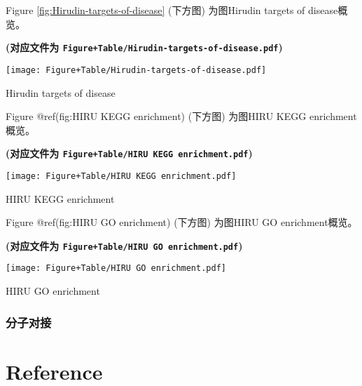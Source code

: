 \documentclass[
]{article}
\begin{document}
Figure \ref{fig:Hirudin-targets-of-disease} (下方图) 为图Hirudin targets of disease概览。

\textbf{(对应文件为 \texttt{Figure+Table/Hirudin-targets-of-disease.pdf})}

\def\@captype{figure}
\begin{center}
\texttt{[image: Figure+Table/Hirudin-targets-of-disease.pdf]}
\caption{Hirudin targets of disease}\label{fig:Hirudin-targets-of-disease}
\end{center}

Figure @ref(fig:HIRU KEGG enrichment) (下方图) 为图HIRU KEGG enrichment概览。

\textbf{(对应文件为 \texttt{Figure+Table/HIRU\ KEGG\ enrichment.pdf})}

\def\@captype{figure}
\begin{center}
\texttt{[image: Figure+Table/HIRU KEGG enrichment.pdf]}
\caption{HIRU KEGG enrichment}\label{fig:HIRU KEGG enrichment}
\end{center}

Figure @ref(fig:HIRU GO enrichment) (下方图) 为图HIRU GO enrichment概览。

\textbf{(对应文件为 \texttt{Figure+Table/HIRU\ GO\ enrichment.pdf})}

\def\@captype{figure}
\begin{center}
\texttt{[image: Figure+Table/HIRU GO enrichment.pdf]}
\caption{HIRU GO enrichment}\label{fig:HIRU GO enrichment}
\end{center}

\hypertarget{ux5206ux5b50ux5bf9ux63a5}{%
\subsubsection{分子对接}\label{ux5206ux5b50ux5bf9ux63a5}}

\hypertarget{bibliography}{%
\section*{Reference}\label{bibliography}}
\end{document}
